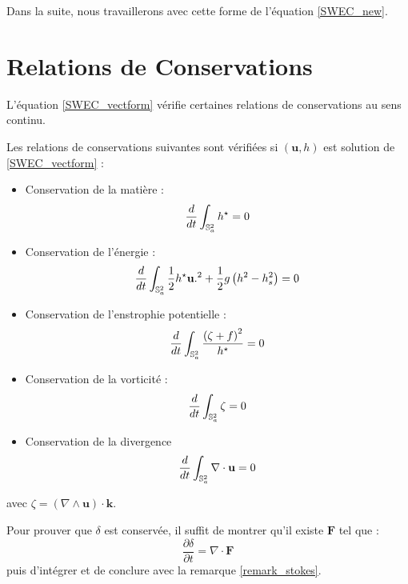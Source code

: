 Dans la suite, nous travaillerons avec cette forme de l'équation \eqref{SWEC_new}.


\section{Relations de Conservations}

L'équation \eqref{SWEC_vectform} vérifie certaines relations de conservations au sens continu.

\begin{proposition}
Les relations de conservations suivantes sont vérifiées si $(\mathbf{u},h)$ est solution de \eqref{SWEC_vectform} :
\begin{itemize}
\item Conservation de la matière :
\begin{equation}
\dfrac{d}{dt} \displaystyle\int_{\mathbb{S}_a^2} h^{\star} = 0
\label{eq:mass}
\end{equation}
 
\item Conservation de l'énergie :
\begin{equation}
\dfrac{d}{dt} \displaystyle\int_{\mathbb{S}_a^2} \dfrac{1}{2} h^{\star} \mathbf{u}.^2 + \dfrac{1}{2} g \left( h^2 - h_s^2 \right) = 0
\label{eq:energy}
\end{equation}

\item Conservation de l'enstrophie potentielle :
\begin{equation}
\dfrac{d}{dt} \displaystyle\int_{\mathbb{S}_a^2} \dfrac{\left( \zeta + f \right)^2}{h^{\star}} = 0
\label{eq:enstrophie}
\end{equation}

\item Conservation de la vorticité :
\begin{equation}
\dfrac{d}{dt} \displaystyle\int_{\mathbb{S}_a^2} \zeta = 0
\label{eq:vorticity}
\end{equation}

\item Conservation de la divergence
\begin{equation}
\dfrac{d}{dt} \displaystyle\int_{\mathbb{S}_a^2} \nabla \cdot \mathbf{u} = 0
\label{eq:divergence}
\end{equation}
\end{itemize}

avec $\zeta = \left( \nabla \wedge \mathbf{u} \right) \cdot \mathbf{k}$.
\end{proposition}

\begin{remarque}
Pour prouver que $\delta$ est conservée, il suffit de montrer qu'il existe $\mathbf{F}$ tel que :
$$
\dfrac{\partial \delta}{\partial t} = \nabla \cdot \mathbf{F}
$$
puis d'intégrer et de conclure avec la remarque \ref{remark_stokes}.
\label{rmq:int diverg nulle}
\end{remarque}

